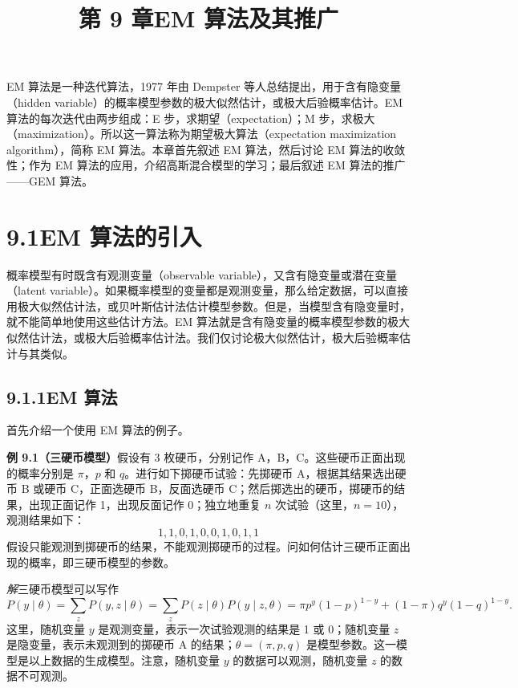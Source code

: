 \documentclass[UTF8,12pt,a4paper,fontset=fandol]{ctexart}
\title{第 9 章\quad EM 算法及其推广}
\author{}
\date{}
\begin{document}
\maketitle

EM 算法是一种迭代算法，1977 年由 Dempster 等人总结提出，用于含有隐变量（hidden variable）的概率模型参数的极大似然估计，或极大后验概率估计。EM 算法的每次迭代由两步组成：E 步，求期望（expectation）；M 步，求极大（maximization）。所以这一算法称为期望极大算法（expectation maximization algorithm），简称 EM 算法。本章首先叙述 EM 算法，然后讨论 EM 算法的收敛性；作为 EM 算法的应用，介绍高斯混合模型的学习；最后叙述 EM 算法的推广——GEM 算法。

\section*{9.1\quad EM 算法的引入}

概率模型有时既含有观测变量（observable variable），又含有隐变量或潜在变量（latent variable）。如果概率模型的变量都是观测变量，那么给定数据，可以直接用极大似然估计法，或贝叶斯估计法估计模型参数。但是，当模型含有隐变量时，就不能简单地使用这些估计方法。EM 算法就是含有隐变量的概率模型参数的极大似然估计法，或极大后验概率估计法。我们仅讨论极大似然估计，极大后验概率估计与其类似。

\subsection*{9.1.1\quad EM 算法}

首先介绍一个使用 EM 算法的例子。

\noindent\textbf{例 9.1（三硬币模型）}\quad 假设有 3 枚硬币，分别记作 A，B，C。这些硬币正面出现的概率分别是 $\pi$，$p$ 和 $q$。进行如下掷硬币试验：先掷硬币 A，根据其结果选出硬币 B 或硬币 C，正面选硬币 B，反面选硬币 C；然后掷选出的硬币，掷硬币的结果，出现正面记作 1，出现反面记作 0；独立地重复 $n$ 次试验（这里，$n=10$），观测结果如下：
\[
  1,1,0,1,0,0,1,0,1,1
\]
假设只能观测到掷硬币的结果，不能观测掷硬币的过程。问如何估计三硬币正面出现的概率，即三硬币模型的参数。

\noindent\textit{解}\quad 三硬币模型可以写作
\begin{equation}
  P(y\mid\theta)=\sum_z P(y,z\mid\theta)=\sum_z P(z\mid\theta)P(y\mid z,\theta)
  =\pi p^y(1-p)^{1-y}+(1-\pi)q^y(1-q)^{1-y}.
  \tag{9.1}
\end{equation}
这里，随机变量 $y$ 是观测变量，表示一次试验观测的结果是 1 或 0；随机变量 $z$ 是隐变量，表示未观测到的掷硬币 A 的结果；$\theta=(\pi,p,q)$ 是模型参数。这一模型是以上数据的生成模型。注意，随机变量 $y$ 的数据可以观测，随机变量 $z$ 的数据不可观测。
\end{document}
